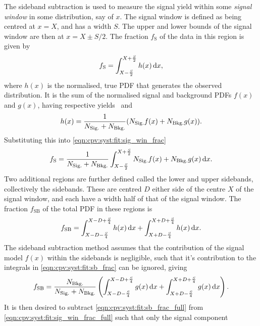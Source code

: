 The sideband subtraction is used to measure the signal yield within some 
\emph{signal window} in some distribution, say of $x$.
The signal window is defined as being centred at $x = X$, and has a width $S$.
The upper and lower bounds of the signal window are then at $x = X \pm S/2$.
The fraction $f_{\text{S}}$ of the data in this region is given by
\begin{equation}
  f_{\text{S}} = \int_{X - \frac{S}{2}}^{X + \frac{S}{2}} h(x) \mathop{}\!\textnormal{d}{x},
  \label{eqn:cpv:syst:fit:sig_win_frac}
\end{equation}
where $h(x)$ is the normalised, true \ac{PDF} that generates the observed 
distribution.
It is the sum of the normalised signal and background \acp{PDF} $f(x)$ and 
$g(x)$, having respective yields \nsig\ and \nbkg
\begin{equation}
  h(x) = \frac{1}{N_{\text{Sig.}} + N_{\text{Bkg.}}}(N_{\text{Sig.}} f(x) + N_{\text{Bkg.}} g(x)).
\end{equation}
Substituting this into \cref{eqn:cpv:syst:fit:sig_win_frac}
\begin{equation}
  f_{\text{S}} = \frac{1}{N_{\text{Sig.}} + N_{\text{Bkg.}}}
    \int_{X - \frac{S}{2}}^{X + \frac{S}{2}}
    N_{\text{Sig.}} f(x) + N_{\text{Bkg.}} g(x)
    \mathop{}\!\textnormal{d}{x}.
  \label{eqn:cpv:syst:fit:sig_win_frac_full}
\end{equation}
Two additional regions are further defined called the lower and upper 
sidebands, collectively the sidebands.
These are centred $D$ either side of the centre $X$ of the signal window, and 
each have a width half of that of the signal window.
The fraction $f_{\text{SB}}$ of the total \ac{PDF} in these regions is
\begin{equation}
  f_{\text{SB}} = \int_{X - D - \frac{S}{4}}^{X - D + \frac{S}{4}} h(x) \mathop{}\!\textnormal{d}{x}
    + \int_{X + D - \frac{S}{4}}^{X + D + \frac{S}{4}} h(x) \mathop{}\!\textnormal{d}{x}.
  \label{eqn:cpv:syst:fit:sb_frac}
\end{equation}
The sideband subtraction method assumes that the contribution of the signal 
model $f(x)$ within the sidebands is negligible, such that it's contribution to 
the integrals in \cref{eqn:cpv:syst:fit:sb_frac} can be ignored, giving
\begin{equation}
  f_{\text{SB}} = \frac{N_{\text{Bkg.}}}{N_{\text{Sig.}} + N_{\text{Bkg.}}}\left(
    \int_{X - D - \frac{S}{4}}^{X - D + \frac{S}{4}} g(x) \mathop{}\!\textnormal{d}{x} +
    \int_{X + D - \frac{S}{4}}^{X + D + \frac{S}{4}} g(x) \mathop{}\!\textnormal{d}{x}
  \right).
  \label{eqn:cpv:syst:fit:sb_frac_full}
\end{equation}
It is then desired to subtract \cref{eqn:cpv:syst:fit:sb_frac_full} from
\cref{eqn:cpv:syst:fit:sig_win_frac_full} such that only the signal component 
